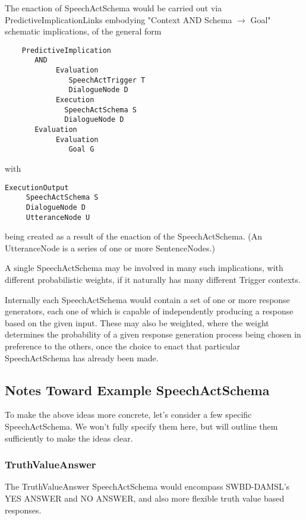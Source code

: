 \documentclass[10pt]{article}
\begin{document}
The enaction of SpeechActSchema would be carried out via PredictiveImplicationLinks embodying "Context AND Schema $\rightarrow$ Goal" schematic implications, of the general form

\begin{verbatim}
    PredictiveImplication
       AND
            Evaluation
               SpeechActTrigger T
               DialogueNode D
            Execution
              SpeechActSchema S
              DialogueNode D
       Evaluation
            Evaluation
               Goal G
\end{verbatim}

\noindent with

\begin{verbatim}
ExecutionOutput
     SpeechActSchema S
     DialogueNode D
     UtteranceNode U
\end{verbatim}

\noindent being created as a result of the enaction of the SpeechActSchema.   (An UtteranceNode is a series of one or more SentenceNodes.)

A single SpeechActSchema may be involved in many such implications, with different probabilistic weights, if it naturally has many different Trigger contexts.

Internally each SpeechActSchema would contain a set of one or more response generators, each one of which is capable of independently producing a response based on the given input.  These may also be weighted, where the weight determines the probability of a given response generation process being chosen in preference to the others, once the choice to enact that particular SpeechActSchema has already been made.

\subsection{Notes Toward Example SpeechActSchema}

To make the above ideas more concrete, let's consider a few specific SpeechActSchema.  We won't fully specify them here, but will outline them sufficiently to make the ideas clear.

\subsubsection{TruthValueAnswer}

The TruthValueAnswer SpeechActSchema would encompass SWBD-DAMSL's YES ANSWER and NO ANSWER, and also more flexible truth value based responses.  
\end{document}
